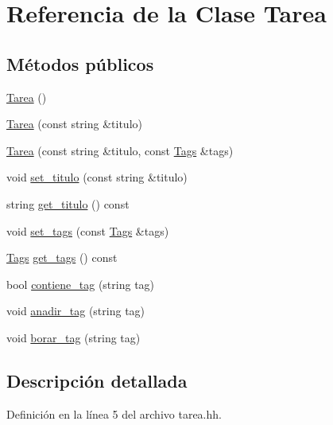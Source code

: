 \hypertarget{class_tarea}{\section{Referencia de la Clase Tarea}
\label{class_tarea}
}
\subsection*{Métodos públicos}
\begin{DoxyCompactItemize}
\item 
\hyperlink{class_tarea_afd1c4fcbd6fe22188e6f0dae6b44829b}{Tarea} ()
\item 
\hyperlink{class_tarea_abaa681784a3da14374a729fcfa68bd05}{Tarea} (const string \&titulo)
\item 
\hyperlink{class_tarea_a1d62458f1415a8663f3138ca670488bb}{Tarea} (const string \&titulo, const \hyperlink{class_tags}{Tags} \&tags)
\item 
void \hyperlink{class_tarea_aa9371098468f9074182b5df5dc240fc3}{set\-\_\-titulo} (const string \&titulo)
\item 
string \hyperlink{class_tarea_a101c30f2185d0e69b7e3188fad33041f}{get\-\_\-titulo} () const 
\item 
void \hyperlink{class_tarea_a70871ce092aceb665b59f2094520bba4}{set\-\_\-tags} (const \hyperlink{class_tags}{Tags} \&tags)
\item 
\hyperlink{class_tags}{Tags} \hyperlink{class_tarea_a36fa738d7b7b34992e723c69a7c67065}{get\-\_\-tags} () const 
\item 
bool \hyperlink{class_tarea_a7cee2384eaa90dce92f2f385268b34f6}{contiene\-\_\-tag} (string tag)
\item 
void \hyperlink{class_tarea_ad2bddff256aeee98a50b84c0aa0a002d}{anadir\-\_\-tag} (string tag)
\item 
void \hyperlink{class_tarea_a7c92a7021f2b2ef18092e4a9bb27b24d}{borar\-\_\-tag} (string tag)
\end{DoxyCompactItemize}


\subsection{Descripción detallada}


Definición en la línea 5 del archivo tarea.\-hh.



